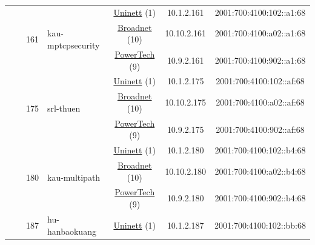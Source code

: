 \begin{small}
\begin{center}
\begin{longtable}{|c|c|c|c|c|c|c|c|}
  &  & \multirow{3}{*}{\tiny{161}} & \multicolumn{1}{|l|}{\multirow{3}{*}{\tiny{kau-mptcpsecurity}}} & \multicolumn{2}{|c|}{\tiny{\href{https://www.uninett.no}{Uninett} (1)}} & \tiny{10.1.2.161} & \tiny{2001:700:4100:102::a1:68} \\* \cline{5-5}\cline{6-6}\cline{7-7}\cline{8-8}
  &  &  &  & \multicolumn{2}{|c|}{\tiny{\href{https://www.broadnet.no}{Broadnet} (10)}} & \tiny{10.10.2.161} & \tiny{2001:700:4100:a02::a1:68} \\* \cline{5-5}\cline{6-6}\cline{7-7}\cline{8-8}
  &  &  &  & \multicolumn{2}{|c|}{\tiny{\href{http://www.powertech.no}{PowerTech} (9)}} & \tiny{10.9.2.161} & \tiny{2001:700:4100:902::a1:68} \\* \cline{3-3}\cline{4-4}\cline{5-5}\cline{6-6}\cline{7-7}\cline{8-8}
  &  & \multirow{3}{*}{\tiny{175}} & \multicolumn{1}{|l|}{\multirow{3}{*}{\tiny{srl-thuen}}} & \multicolumn{2}{|c|}{\tiny{\href{https://www.uninett.no}{Uninett} (1)}} & \tiny{10.1.2.175} & \tiny{2001:700:4100:102::af:68} \\* \cline{5-5}\cline{6-6}\cline{7-7}\cline{8-8}
  &  &  &  & \multicolumn{2}{|c|}{\tiny{\href{https://www.broadnet.no}{Broadnet} (10)}} & \tiny{10.10.2.175} & \tiny{2001:700:4100:a02::af:68} \\* \cline{5-5}\cline{6-6}\cline{7-7}\cline{8-8}
  &  &  &  & \multicolumn{2}{|c|}{\tiny{\href{http://www.powertech.no}{PowerTech} (9)}} & \tiny{10.9.2.175} & \tiny{2001:700:4100:902::af:68} \\* \cline{3-3}\cline{4-4}\cline{5-5}\cline{6-6}\cline{7-7}\cline{8-8}
  &  & \multirow{3}{*}{\tiny{180}} & \multicolumn{1}{|l|}{\multirow{3}{*}{\tiny{kau-multipath}}} & \multicolumn{2}{|c|}{\tiny{\href{https://www.uninett.no}{Uninett} (1)}} & \tiny{10.1.2.180} & \tiny{2001:700:4100:102::b4:68} \\* \cline{5-5}\cline{6-6}\cline{7-7}\cline{8-8}
  &  &  &  & \multicolumn{2}{|c|}{\tiny{\href{https://www.broadnet.no}{Broadnet} (10)}} & \tiny{10.10.2.180} & \tiny{2001:700:4100:a02::b4:68} \\* \cline{5-5}\cline{6-6}\cline{7-7}\cline{8-8}
  &  &  &  & \multicolumn{2}{|c|}{\tiny{\href{http://www.powertech.no}{PowerTech} (9)}} & \tiny{10.9.2.180} & \tiny{2001:700:4100:902::b4:68} \\* \cline{3-3}\cline{4-4}\cline{5-5}\cline{6-6}\cline{7-7}\cline{8-8}
  &  & \multirow{3}{*}{\tiny{187}} & \multicolumn{1}{|l|}{\multirow{3}{*}{\tiny{hu-hanbaokuang}}} & \multicolumn{2}{|c|}{\tiny{\href{https://www.uninett.no}{Uninett} (1)}} & \tiny{10.1.2.187} & \tiny{2001:700:4100:102::bb:68} \\* \cline{5-5}\cline{6-6}\cline{7-7}\cline{8-8}

\end{longtable}
\end{center}
\end{small}
